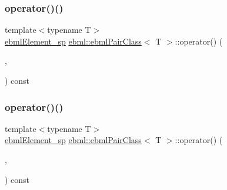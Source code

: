 \subsubsection{\texorpdfstring{operator()()}{operator()()}\hspace{0.1cm}{\footnotesize\ttfamily [2/5]}}
{\footnotesize\ttfamily template$<$typename T$>$ \\
\mbox{\hyperlink{namespaceebml_adad533b7705a16bb360fe56380c5e7be}{ebml\+Element\+\_\+sp}} \mbox{\hyperlink{classebml_1_1ebmlPairClass}{ebml\+::ebml\+Pair\+Class}}$<$ T $>$\+::operator() (\begin{DoxyParamCaption}\item[{\mbox{\hyperlink{namespaceebml_adad533b7705a16bb360fe56380c5e7be}{ebml\+Element\+\_\+sp}} \&\&}]{,  }\item[{\mbox{\hyperlink{namespaceebml_adad533b7705a16bb360fe56380c5e7be}{ebml\+Element\+\_\+sp}} \&\&}]{ }\end{DoxyParamCaption}) const}

\mbox{\label{classebml_1_1ebmlPairClass_ab34a8f614bf92ab90fb37d178aaa0f0b}} 
\subsubsection{\texorpdfstring{operator()()}{operator()()}\hspace{0.1cm}{\footnotesize\ttfamily [3/5]}}
{\footnotesize\ttfamily template$<$typename T$>$ \\
\mbox{\hyperlink{namespaceebml_adad533b7705a16bb360fe56380c5e7be}{ebml\+Element\+\_\+sp}} \mbox{\hyperlink{classebml_1_1ebmlPairClass}{ebml\+::ebml\+Pair\+Class}}$<$ T $>$\+::operator() (\begin{DoxyParamCaption}\item[{const T \&}]{,  }\item[{const \mbox{\hyperlink{namespaceebml_adad533b7705a16bb360fe56380c5e7be}{ebml\+Element\+\_\+sp}} \&}]{ }\end{DoxyParamCaption}) const}

\mbox{\label{classebml_1_1ebmlPairClass_adf29892f267e47bd519b20811ed8e449}} 
